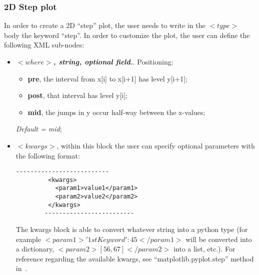 \subsubsection{2D Step plot}
In order to create a 2D ``step'' plot, the user needs to write in the $<type>$ body the keyword ``step''. In order to customize the plot, the user can define the following XML sub-nodes:
  \begin{itemize}
     \item $<where>$\textbf{\textit{, string, optional  field.}}.  Positioning:
     \begin{itemize}
      \item \textbf{pre}, the interval from x[i] to x[i+1] has level y[i+1];
      \item \textbf{post}, that interval has level y[i];
      \item \textbf{mid}, the jumps in y occur half-way between the x-values;
     \end{itemize}
      \textit{Default = mid};
 \item \textit{$<kwargs>$},  within this block the user can specify optional parameters with the following format:
        \begin{lstlisting}[style=XML]
        --------------------------
         <kwargs>
           <param1>value1</param1>
           <param2>value2</param2>
         </kwargs>
        -------------------------
       \end{lstlisting}
         The kwargs block is able to convert whatever string into a python type (for example $<param1>{'1stKeyword':45}</param1>$ will be converted into a dictionary, $<param2>[56,67]</param2>$ into a list, etc.). For reference regarding the available kwargs, see ``matplotlib.pyplot.step'' method in~\cite{MatPlotLib}.
    \end{itemize}

